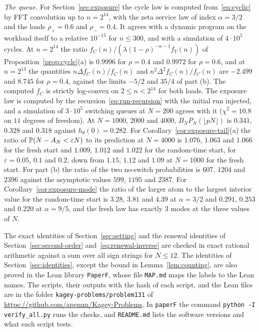 \emph{The queue.} For Section~\ref{sec:exposure} the cycle law is computed
from~\eqref{eq:cyclic} by FFT convolution up to $n=2^{14}$, with the zeta service law of
index $\alpha=3/2$ and the loads $\rho_\plus=0.6$ and $\rho_\minus=0.4$. It agrees with a
dynamic program on the workload itself to a relative $10^{-15}$ for $n\le300$, and with a
simulation of $4\cdot10^5$ cycles. At $n=2^{14}$ the ratio
$f_C(n)/(\lambda(1-\rho)^{-\alpha-1}f_Y(n))$ of Proposition~\ref{prop:cycle}(a) is $0.9996$
for $\rho=0.4$ and $0.9972$ for $\rho=0.6$, and at $n=2^{13}$ the quantities
$n\Delta f_C(n)/f_C(n)$ and $n^2\Delta^2f_C(n)/f_C(n)$ are $-2.499$ and $8.745$ for
$\rho=0.4$, against the limits $-5/2$ and $35/4$ of part (b). The computed $f_C$ is
strictly log-convex on $2\le n<2^{14}$ for both loads. The exposure law is computed by the
recursion~\eqref{eq:run-recursion} with the initial run injected, and a simulation of
$3\cdot10^5$ switching queues at $N=200$ agrees with it ($\chi^2=10.8$ on $11$ degrees of
freedom). At $N=1000$, $2000$ and $4000$, $B_NP_N(\lfloor pN\rfloor)$ is $0.341$, $0.328$ and
$0.318$ against $h_\theta(0)=0.282$. For Corollary~\ref{cor:exposure-tail}(a) the ratio of
$\mathbb{P}(N-A_N<\varepsilon N)$ to its prediction at $N=4000$ is $1.076$, $1.063$ and $1.066$ for
the fresh start and $1.009$, $1.012$ and $1.022$ for the random-time start, for
$\varepsilon=0.05$, $0.1$ and $0.2$, down from $1.15$, $1.12$ and $1.09$ at $N=1000$ for the
fresh start. For part (b) the ratio of the two no-switch probabilities is $607$, $1204$ and
$2396$ against the asymptotic values $599$, $1195$ and $2387$. For
Corollary~\ref{cor:exposure-mode} the ratio of the larger atom to the largest interior
value for the random-time start is $3.28$, $3.81$ and $4.39$ at $\alpha=3/2$ and $0.291$,
$0.253$ and $0.220$ at $\alpha=9/5$, and the fresh law has exactly 3 modes at the three
values of $N$.

The exact identities of Section~\ref{sec:setting} and the renewal identities of
Section~\ref{sec:second-order}\ifarxivbuild{} and~\eqref{eq:renewal-inverse}\fi{} are checked
in exact rational arithmetic against a sum over all sign strings for $N\le12$. The
identities of Section~\ref{sec:identities}, except the bound in Lemma~\ref{lem:counting},
are also proved in the Lean library \nolinkurl{PaperF}, whose file \nolinkurl{MAP.md} maps the
labels to the Lean names. The scripts, their outputs with the hash of each script, and the
Lean files are in the folder \nolinkurl{kagey-problems/problem131} of
\url{https://github.com/apemm/Kagey-Problems}. In \nolinkurl{paperF} the command
\texttt{python -I verify\_all.py} runs the checks, and \nolinkurl{README.md} lists the
software versions and what each script tests.
